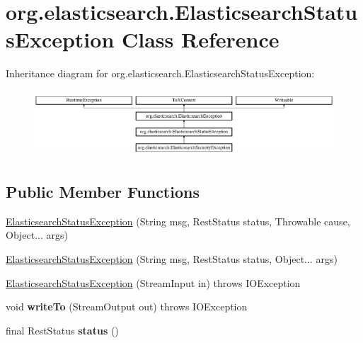 \hypertarget{classorg_1_1elasticsearch_1_1_elasticsearch_status_exception}{}\section{org.\+elasticsearch.\+Elasticsearch\+Status\+Exception Class Reference}
\label{classorg_1_1elasticsearch_1_1_elasticsearch_status_exception}
Inheritance diagram for org.\+elasticsearch.\+Elasticsearch\+Status\+Exception\+:\begin{figure}[H]
\begin{center}
\leavevmode
\includegraphics[height=2.488889cm]{classorg_1_1elasticsearch_1_1_elasticsearch_status_exception}
\end{center}
\end{figure}
\subsection*{Public Member Functions}
\begin{DoxyCompactItemize}
\item 
\hyperlink{classorg_1_1elasticsearch_1_1_elasticsearch_status_exception_a0e75cb4029aa054eb09e2fb524989c98}{Elasticsearch\+Status\+Exception} (String msg, Rest\+Status status, Throwable cause, Object... args)
\item 
\hyperlink{classorg_1_1elasticsearch_1_1_elasticsearch_status_exception_a8a059a544162d4a87a4808fc346e5f1e}{Elasticsearch\+Status\+Exception} (String msg, Rest\+Status status, Object... args)
\item 
\hyperlink{classorg_1_1elasticsearch_1_1_elasticsearch_status_exception_aea6fd693dc783d497b7ce62eb4804454}{Elasticsearch\+Status\+Exception} (Stream\+Input in)  throws I\+O\+Exception 
\item 
\hypertarget{classorg_1_1elasticsearch_1_1_elasticsearch_status_exception_a5ab3cb590573abd8fb8fe909a80b21e6}{}\label{classorg_1_1elasticsearch_1_1_elasticsearch_status_exception_a5ab3cb590573abd8fb8fe909a80b21e6} 
void {\bfseries write\+To} (Stream\+Output out)  throws I\+O\+Exception 
\item 
\hypertarget{classorg_1_1elasticsearch_1_1_elasticsearch_status_exception_aa86710084c254d7e78f10379b4de2d83}{}\label{classorg_1_1elasticsearch_1_1_elasticsearch_status_exception_aa86710084c254d7e78f10379b4de2d83} 
final Rest\+Status {\bfseries status} ()
\end{DoxyCompactItemize}
